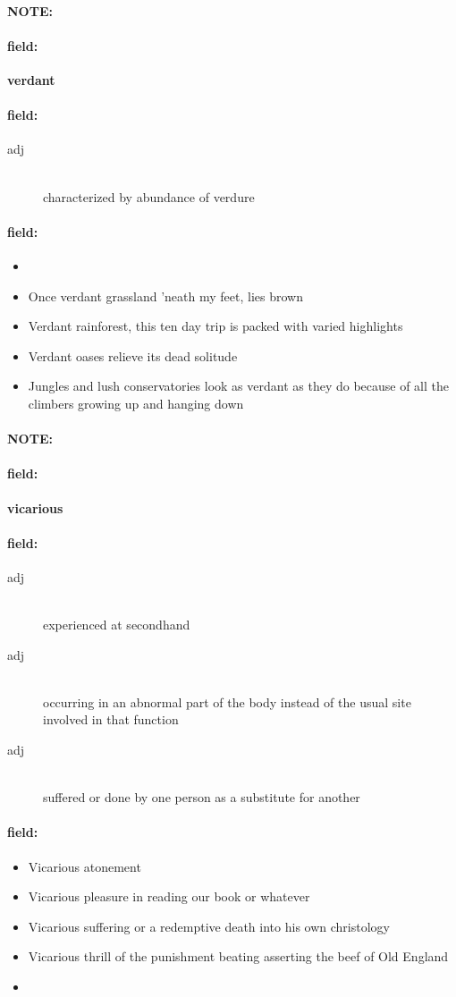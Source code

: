 \documentclass[12pt]{article}
\newenvironment{note}{\paragraph{NOTE:}}{}
\newenvironment{field}{\paragraph{field:}}{}
\begin{document}
\begin{note}
\begin{field}
\textbf{\large verdant}
\end{field}


\begin{field}
\begin{description}
\item[adj] \hfill \\ 
characterized by abundance of verdure

\end{description}
\end{field}

\begin{field}
\begin{itemize}
\item 
\item Once verdant grassland 'neath my feet, lies brown
\item Verdant rainforest, this ten day trip is packed with varied highlights
\item Verdant oases relieve its dead solitude
\item Jungles and lush conservatories look as verdant as they do because of all the climbers growing up and hanging down
\end{itemize}
\end{field}
\end{note}
\begin{note}
\begin{field}
\textbf{\large vicarious}
\end{field}


\begin{field}
\begin{description}
\item[adj] \hfill \\ 
experienced at secondhand

\item[adj] \hfill \\ 
occurring in an abnormal part of the body instead of the usual site involved in that function

\item[adj] \hfill \\ 
suffered or done by one person as a substitute for another

\end{description}
\end{field}

\begin{field}
\begin{itemize}
\item Vicarious atonement
\item Vicarious pleasure in reading our book or whatever
\item Vicarious suffering or a redemptive death into his own christology
\item Vicarious thrill of the punishment beating asserting the beef of Old England
\item 
\end{itemize}
\end{field}
\end{note}
\end{document}
